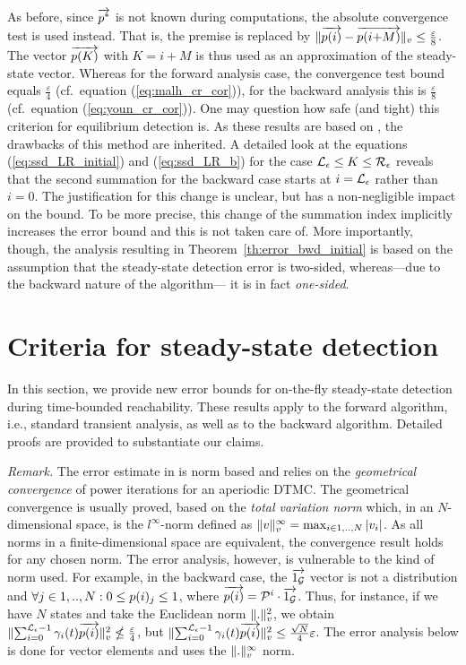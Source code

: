 \documentclass{entcs}
\newcommand{\Section}[1]{\section{#1}}
\begin{document}
		As before, since $\overrightarrow{p^{*}}$ is not known during computations, the absolute convergence test is used instead. That is, the premise is replaced by  $\lVert \overrightarrow{p(i)} - \overrightarrow{p(i{+}M)} \rVert_{v} \leq \frac{\varepsilon}{8}$.
		The vector $\overrightarrow{p(K)}$ with $K=i{+}M$ is thus used as an approximation of the steady-state vector. Whereas for the forward analysis case, the convergence test bound equals $\frac{\varepsilon}{4}$ (cf.\ equation (\ref{eq:malh_cr_cor})), for the backward analysis this is $\frac{\varepsilon}{8}$  (cf.\ equation (\ref{eq:youn_cr_cor})).  One may question how safe (and tight) this criterion for equilibrium detection is.  As these results are based on \cite{MalhotraMT_MR94}, the drawbacks of this method are inherited.  A detailed look at the equations (\ref{eq:ssd_LR_initial}) and (\ref{eq:ssd_LR_b}) for the case $\mathcal{L}_{\epsilon} \leq K \leq \mathcal{R}_{\epsilon}$ reveals that the second summation for the backward case starts at $i=\mathcal{L}_{\epsilon}$ rather than $i=0$.  The justification for this change is unclear, but has a non-negligible impact on the bound. To be more precise, this change of the summation index implicitly increases the error bound and this is not taken care of. More importantly, though,  the analysis resulting in Theorem~\ref{th:error_bwd_initial} is based on the assumption that the steady-state detection error is two-sided, whereas---due to the backward nature of the algorithm--- it is in fact \emph{one-sided}.

\Section{Criteria for steady-state detection \label{s:ss_detect_improved}}

	In this section, we provide new error bounds for on-the-fly steady-state detection during time-bounded reachability.  These results apply to the forward algorithm, i.e., standard transient analysis, as well as to the backward algorithm. Detailed proofs are provided to substantiate our claims.

	\emph{Remark.} The error estimate in \cite{MalhotraMT_MR94} is norm based and relies on the \emph{geometrical convergence} of power iterations for an aperiodic DTMC. The geometrical convergence is usually proved, based on the \emph{total variation norm} which, in an $N$-dimensional space, is the $l^{\infty}$-norm defined as $\lVert  v  \rVert_{v}^{\infty} = \max_{i \in 1,..,N} |v_{i}|$. As all norms in a finite-dimensional space are equivalent, the convergence result holds for any chosen norm.  The error analysis, however, is vulnerable to the kind of norm used.  For example, in the backward case, the $\overrightarrow{1_{\mathcal{G}}}$ vector is not a distribution and $\forall j \in 1,..,N: 0 \leq p(i)_{j} \leq 1$, where $\overrightarrow{p(i)}=\mathcal{P}^{i} \cdot \overrightarrow{1_{\mathcal{G}}}$. Thus, for instance, if we have $N$ states and take the Euclidean norm $\lVert  .  \rVert_{v}^{2}$, we obtain $\lVert  \sum_{i=0}^{\mathcal{L}_{\epsilon}-1} \gamma_{i}(t) \overrightarrow{p(i)}  \rVert_{v}^{2} \nleq \frac{\varepsilon}{4}$, but $\lVert  \sum_{i=0}^{\mathcal{L}_{\epsilon}-1} \gamma_{i}(t) \overrightarrow{p(i)}  \rVert_{v}^{2} \leq \frac{\sqrt{N}}{4}\varepsilon$.  The error analysis below is done for vector elements and uses the $\lVert  .  \rVert_{v}^{\infty}$ norm.
\end{document}
